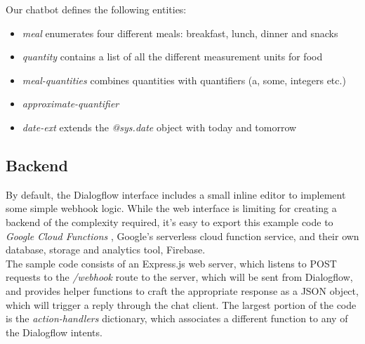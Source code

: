 Our chatbot defines the following entities:
\begin{itemize}
  \item \textit{meal} enumerates four different meals: breakfast, lunch, dinner and snacks
  \item \textit{quantity} contains a list of all the different measurement units for food
  \item \textit{meal-quantities} combines quantities with quantifiers (a, some, integers etc.)
  \item \textit{approximate-quantifier}
  \item \textit{date-ext} extends the \textit{@sys.date} object with today and tomorrow
\end{itemize}

\subsection{Backend}
By default, the Dialogflow interface includes a small inline editor to implement some simple webhook logic. While the web interface is limiting for creating a backend of the complexity required, it's easy to export this example code to \textit{Google Cloud Functions} \cite{gcfwebsite}, Google's serverless cloud function service, and their own database, storage and analytics tool, Firebase. \\
The sample code consists of an Express.js \cite{expresswebsite} web server, which listens to POST requests to the \textit{/webhook} route to the server, which will be sent from Dialogflow, and provides helper functions to craft the appropriate response as a JSON object, which will trigger a reply through the chat client. The largest portion of the code is the \textit{action-handlers} dictionary, which associates a different function to any of the Dialogflow intents. 

